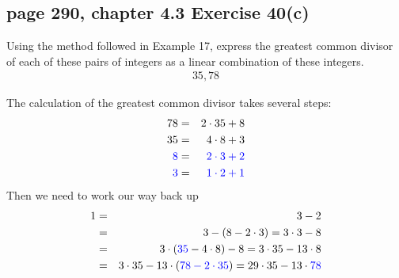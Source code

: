 \documentclass[sigconf]{acmart}
\newcommand{\answer}[2]{%
  \if\relax\detokenize{#2}\relax
    \underline{\mbox{請作答}}%
  \else
    \textcolor{blue}{#2}%
  \fi
}
\begin{document}
\subsection{page 290, chapter 4.3 Exercise 40(c)}
\begin{shaded}
    Using the method followed in Example 17, express the greatest common divisor of each of these pairs of integers as a linear combination of these integers.   
    \begin{eqnarray*}
        35, 78
    \end{eqnarray*}
\end{shaded}  
The calculation of the greatest common divisor takes several steps:
\begin{eqnarray*}
    78 & = & 2 \cdot 35 + 8 \\
    35 & = & 4 \cdot 8 + 3 \\
    \answer{4.3.40a}{8} & = & \answer{4.3.40b}{2 \cdot 3 + 2} \\
	\answer{4.3.40c}{3} & = & \answer{4.3.40d}{1 \cdot 2 + 1}
\end{eqnarray*}
Then we need to work our way back up
\begin{eqnarray*}
    1 & = & 3 - 2 \\
    ~ & = & 3 - (8 - 2 \cdot 3)  =  3 \cdot 3 - 8 \\
    ~ & = & 3 \cdot (\answer{4.3.40e}{35} - 4 \cdot 8) -8 =  3 \cdot 35 - 13 \cdot 8 \\
    ~ & = & 3 \cdot 35 - 13 \cdot (\answer{4.3.40f}{78 - 2 \cdot 35})  =  29 \cdot 35 - 13 \cdot \answer{4.3.40g}{78}
\end{eqnarray*}
\end{document}
